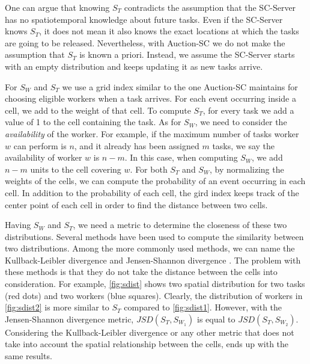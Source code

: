 One can argue that knowing $S_T$ contradicts the assumption that the SC-Server has no spatiotemporal knowledge about future tasks. Even if the SC-Server knows $S_T$, it does not mean it also knows the exact locations at which the tasks are going to be released. Nevertheless, with Auction-SC we do not make the assumption that $S_T$ is known a priori. Instead, we assume the SC-Server starts with an empty distribution and keeps updating it as new tasks arrive.

For $S_W$ and $S_T$ we use a grid index similar to the one Auction-SC maintains for choosing eligible workers when a task arrives. For each event occurring inside a cell, we add to the weight of that cell. To compute $S_T$, for every task we add a value of 1 to the cell containing the task. As for $S_W$, we need to consider the \textit{availability} of the worker. For example, if the maximum number of tasks worker $w$ can perform is $n$, and it already has been assigned $m$ tasks, we say the availability of worker $w$ is $n-m$. In this case, when computing $S_W$, we add $n-m$ units to the cell covering $w$. For both $S_T$ and $S_W$, by normalizing the weights of the cells, we can compute the probability of an event occurring in each cell. In addition to the probability of each cell, the gird index keeps track of the center point of each cell in order to find the distance between two cells.

Having $S_W$ and $S_T$, we need a metric to determine the closeness of these two distributions. Several methods have been used to compute the similarity between two distributions. Among the more commonly used methods, we can name the Kullback-Leibler divergence \cite{Kullback51} and Jensen-Shannon divergence \cite{Lin91}. The problem with these methods is that they do not take the distance between the cells into consideration. For example, \cref{fig:sdist} shows two spatial distribution for two tasks (red dots) and two workers (blue squares). Clearly, the distribution of workers in \cref{fig:sdist2} is more similar to $S_T$ compared to \cref{fig:sdist1}. However, with the Jensen-Shannon divergence metric, $JSD(S_T, S_{W_1})$ is equal to $JSD(S_T, S_{W_2})$. Considering the Kullback-Leibler divergence or any other metric that does not take into account the spatial relationship between the cells, ends up with the same results.

